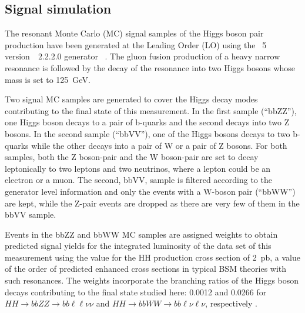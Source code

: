 

\subsection{Signal simulation\label{sec:signalMC}}

The resonant Monte Carlo (MC) signal samples of the Higgs boson pair production have been generated at the Leading Order (LO) using the \MADGRAPH~5 version\ ~2.2.2.0  generator ~\cite{Alwall:2014hca}. The gluon fusion production of a heavy narrow resonance is followed by the decay of the resonance into two Higgs bosons whose mass is set to 125~GeV.

Two signal MC samples are generated to cover the Higgs decay modes contributing to the final state of this measurement. In the first sample (``bbZZ''), one Higgs boson decays to a pair of b-quarks and the second decays into two Z bosons. In the second sample (``bbVV''), one of the Higgs bosons decays to two b-quarks while the other decays into a pair of W or a pair of Z bosons. For both samples, both the Z boson-pair and the W boson-pair are set to decay leptonically to two leptons and two neutrinos, where a lepton could be an electron or a muon. The second, bbVV, sample is filtered according to the generator level information and only the events with a W-boson pair (``bbWW'') are kept, while the Z-pair events are dropped as there are very few of them in the bbVV sample.

Events in the  bbZZ and bbWW MC samples are assigned weights to obtain predicted signal yields for the integrated luminosity of the data set of this measurement using the value for the HH production cross section of 2~pb, a value of the order of predicted enhanced cross sections in typical BSM theories with such resonances. The weights incorporate the branching ratios of the Higgs boson decays contributing to the final state studied here: 0.0012 and 0.0266 for $HH\to bbZZ\to bb\ell\ell\nu\nu$ and $HH\to bbWW\to bb\ell\nu\ell\nu$, respectively \cite{CERNYR4}.



